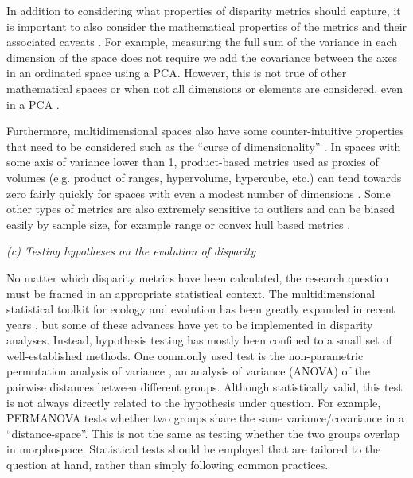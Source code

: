 \documentclass[12pt,letterpaper]{article}
\renewcommand{\subsection}[1]{%
\bigskip
\begin{center}
\begin{large}
\normalfont\itshape #1
\end{large}
\end{center}}
\begin{document}
In addition to considering what properties of disparity metrics should capture, it is important to also consider the mathematical properties of the metrics and their associated caveats \citep{Wills2001-wh, Ciampaglio2001-iz}.
For example, measuring the full sum of the variance in each dimension of the space does not require we add the covariance between the axes in an ordinated space using a PCA.
However, this is not true of other mathematical spaces or when not all dimensions or elements are considered, even in a PCA \citep{Legendre2012-va}.

Furthermore, multidimensional spaces also have some counter-intuitive properties that need to be considered such as the ``curse of dimensionality'' \citep{Bellman1966-mc}.
In spaces with some axis of variance lower than 1, product-based metrics used as proxies of volumes (e.g. product of ranges, hypervolume, hypercube, etc.) can tend towards zero fairly quickly for spaces with even a modest number of dimensions \citep{Bellman1966-mc}. %
Some other types of metrics are also extremely sensitive to outliers and can be biased easily by sample size, for example range \citep{Butler2012-tr}
or convex hull based metrics \citep{Butler2012-tr, Jackson2011-kq}.

\subsection{(c) Testing hypotheses on the evolution of
disparity}

No matter which disparity metrics have been calculated, the research question must be framed in an appropriate statistical context.
The multidimensional statistical toolkit for ecology and evolution has been greatly expanded in recent years \citep{Adams2018-mg}
, but some of these advances have yet to be implemented in disparity analyses. Instead, hypothesis testing has mostly been confined to a small set of well-established methods.
One commonly used test is the non-parametric permutation analysis of variance \citep{Anderson2001-qb, Anderson2013-zt}, an analysis of variance (ANOVA) of the pairwise distances between different groups.
Although statistically valid, this test is not always directly related to the hypothesis under question.
For example, PERMANOVA tests whether two groups share the same variance/covariance in a ``distance-space''.
This is not the same as testing whether the two groups overlap in morphospace.
Statistical tests should be employed that are tailored to the question at hand, rather than simply following common practices.
\end{document}
